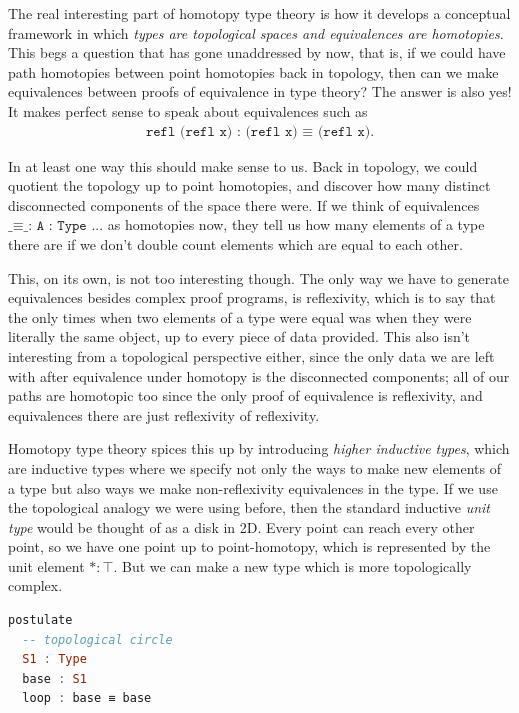 \documentclass[11pt]{article}
\begin{document}
The real interesting part of homotopy type theory is how it develops a conceptual framework in which \emph{types are topological spaces and equivalences are homotopies}. This begs a question that has gone unaddressed by now, that is, if we could have path homotopies between point homotopies back in topology, then can we make equivalences between proofs of equivalence in type theory? The answer is also yes! It makes perfect sense to speak about equivalences such as \begin{gather*}
\texttt{refl (refl x) : (refl x) ≡ (refl x)}.
\end{gather*}

In at least one way this should make sense to us. Back in topology, we could quotient the topology up to point homotopies, and discover how many distinct disconnected components of the space there were. If we think of equivalences $\texttt{\_≡\_ : {A : Type} ...}$ as homotopies now, they tell us how many elements of a type there are if we don't double count elements which are equal to each other.

This, on its own, is not too interesting though. The only way we have to generate equivalences besides complex proof programs, is reflexivity, which is to say that the only times when two elements of a type were equal was when they were literally the same object, up to every piece of data provided. This also isn't interesting from a topological perspective either, since the only data we are left with after equivalence under homotopy is the disconnected components; all of our paths are homotopic too since the only proof of equivalence is reflexivity, and equivalences there are just reflexivity of reflexivity.

Homotopy type theory spices this up by introducing \emph{higher inductive types}, which are inductive types where we specify not only the ways to make new elements of a type but also ways we make non-reflexivity equivalences in the type. If we use the topological analogy we were using before, then the standard inductive \emph{unit type} would be thought of as a disk in 2D. Every point can reach every other point, so we have one point up to point-homotopy, which is represented by the unit element $* \colon \top$. But we can make a new type which is more topologically complex. \begin{lstlisting}[language=Haskell]
postulate
  -- topological circle
  S1 : Type
  base : S1
  loop : base ≡ base
\end{lstlisting}
\end{document}
